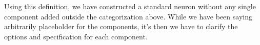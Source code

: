 Using this definition, we have constructed a standard neuron without any single component added outside the categorization above. While we have been saying arbitrarily placeholder for the components, it's then we have to clarify the options and specification for each component. 

\vspace{0.00mm}

